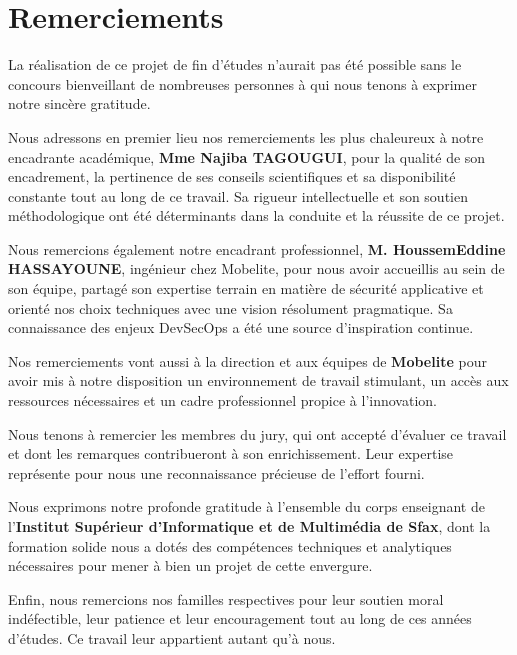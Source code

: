 \chapter*{Remerciements}

La réalisation de ce projet de fin d'études n'aurait pas été possible sans le concours
bienveillant de nombreuses personnes à qui nous tenons à exprimer notre sincère gratitude.

Nous adressons en premier lieu nos remerciements les plus chaleureux à notre encadrante
académique, \textbf{Mme Najiba TAGOUGUI}, pour la qualité de son encadrement, la
pertinence de ses conseils scientifiques et sa disponibilité constante tout au long de
ce travail. Sa rigueur intellectuelle et son soutien méthodologique ont été déterminants
dans la conduite et la réussite de ce projet.

Nous remercions également notre encadrant professionnel, \textbf{M. HoussemEddine
HASSAYOUNE}, ingénieur chez Mobelite, pour nous avoir accueillis au sein de son équipe,
partagé son expertise terrain en matière de sécurité applicative et orienté nos choix
techniques avec une vision résolument pragmatique. Sa connaissance des enjeux DevSecOps
a été une source d'inspiration continue.

Nos remerciements vont aussi à la direction et aux équipes de \textbf{Mobelite} pour
avoir mis à notre disposition un environnement de travail stimulant, un accès aux
ressources nécessaires et un cadre professionnel propice à l'innovation.

Nous tenons à remercier les membres du jury, qui ont accepté d'évaluer ce travail et
dont les remarques contribueront à son enrichissement. Leur expertise représente pour
nous une reconnaissance précieuse de l'effort fourni.

Nous exprimons notre profonde gratitude à l'ensemble du corps enseignant de
l'\textbf{Institut Supérieur d'Informatique et de Multimédia de Sfax}, dont la
formation solide nous a dotés des compétences techniques et analytiques nécessaires
pour mener à bien un projet de cette envergure.

Enfin, nous remercions nos familles respectives pour leur soutien moral indéfectible,
leur patience et leur encouragement tout au long de ces années d'études. Ce travail
leur appartient autant qu'à nous.

\clearpage
